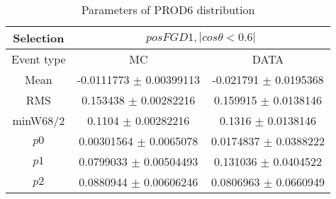 \documentclass[a4paper,12pt]{article}
\begin{document}
\begin{table}[htbp]
\begin{center}
\begin{tabular}{|c|c|c|}
        \hline
        Selection & \multicolumn{2}{|c|}{$posFGD1, |cos\theta<0.6|$}  \\ \hline
        Event type & MC & DATA \\ 
        \hline
        Mean & -0.0111773 $\pm$ 0.00399113 & -0.021791 $\pm$ 0.0195368 \\ 
        \hline 
        RMS & 0.153438 $\pm$ 0.00282216 & 0.159915 $\pm$ 0.0138146 \\ 
        \hline 
        minW68/2 & 0.1104 $\pm$ 0.00282216 & 0.1316 $\pm$ 0.0138146 \\ 
        \hline 
        $p0$ & 0.00301564 $\pm$ 0.0065078 & 0.0174837 $\pm$ 0.0388222 \\ 
        \hline 
        $p1$ & 0.0799033 $\pm$ 0.00504493 & 0.131036 $\pm$ 0.0404522 \\ 
        \hline 
        $p2$ & 0.0880944 $\pm$ 0.00606246 & 0.0806963 $\pm$ 0.0660949 \\ 
        \hline 
\end{tabular}
\caption{Parameters of PROD6 distribution } \vspace{0.2in}
\label{xxx}
\end{center}
\end{table}


\end{document}
